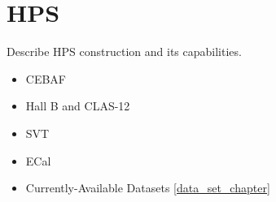 \chapter{HPS}
\label{chapter:experiment}

Describe HPS construction and its capabilities.
\begin{itemize}
    \item CEBAF
    \item Hall B and CLAS-12
    \item SVT
    \item ECal
    \item Currently-Available Datasets \cref{data_set_chapter}
\end{itemize}